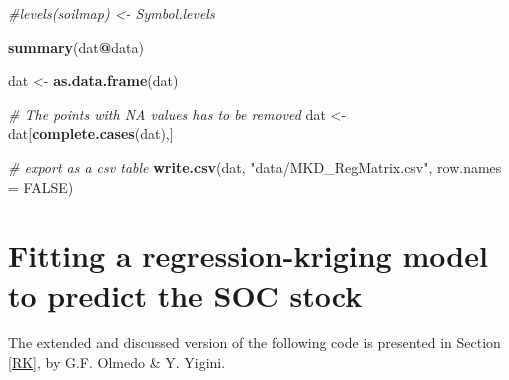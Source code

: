 \documentclass[10pt,b5paper,]{book}
\newenvironment{Shaded}{\begin{snugshade}}{\end{snugshade}}
\newcommand{\CommentTok}[1]{\textcolor[rgb]{0.56,0.35,0.01}{\textit{#1}}}
\newcommand{\DataTypeTok}[1]{\textcolor[rgb]{0.13,0.29,0.53}{#1}}
\newcommand{\KeywordTok}[1]{\textcolor[rgb]{0.13,0.29,0.53}{\textbf{#1}}}
\newcommand{\NormalTok}[1]{#1}
\newcommand{\OperatorTok}[1]{\textcolor[rgb]{0.81,0.36,0.00}{\textbf{#1}}}
\newcommand{\OtherTok}[1]{\textcolor[rgb]{0.56,0.35,0.01}{#1}}
\newcommand{\StringTok}[1]{\textcolor[rgb]{0.31,0.60,0.02}{#1}}
\theoremstyle{definition}
\theoremstyle{definition}
\theoremstyle{definition}
\theoremstyle{remark}
\begin{document}
\begin{Shaded}
\begin{Highlighting}[]
\CommentTok{#levels(soilmap) <- Symbol.levels}

\KeywordTok{summary}\NormalTok{(dat}\OperatorTok{@}\NormalTok{data)}

\NormalTok{dat <-}\StringTok{ }\KeywordTok{as.data.frame}\NormalTok{(dat)}

\CommentTok{# The points with NA values has to be removed}
\NormalTok{dat <-}\StringTok{ }\NormalTok{dat[}\KeywordTok{complete.cases}\NormalTok{(dat),]}

\CommentTok{# export as a csv table}
\KeywordTok{write.csv}\NormalTok{(dat, }\StringTok{"data/MKD_RegMatrix.csv"}\NormalTok{, }\DataTypeTok{row.names =} \OtherTok{FALSE}\NormalTok{)}
\end{Highlighting}
\end{Shaded}

\clearpage

\hypertarget{cd:RK}{%
\section{Fitting a regression-kriging model to predict the SOC
stock}\label{cd:RK}}

The extended and discussed version of the following code is presented in
Section \ref{RK}, by G.F. Olmedo \& Y. Yigini.
\end{document}
